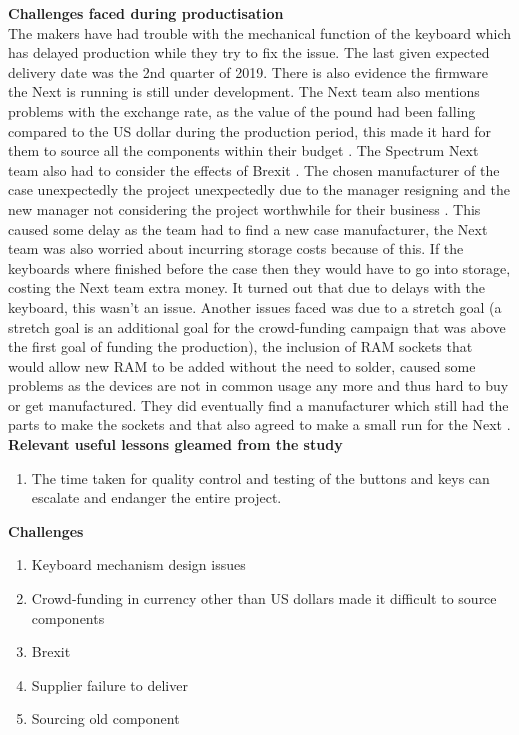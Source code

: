 \textbf{Challenges faced during productisation}\\
The makers have had trouble with the mechanical function of the keyboard which has delayed production while they try to fix the issue. The last given expected delivery date was the 2nd quarter of 2019. There is also evidence the firmware the Next is running is still under development. The Next team also mentions problems with the exchange rate, as the value of the pound had been falling compared to the US dollar during the production period, this made it hard for them to source all the components within their budget 
\cite{RN159}. The Spectrum Next team also had to consider the effects of Brexit 
\cite{RN157}. The chosen manufacturer of the case unexpectedly the project unexpectedly due to the manager resigning and the new manager not considering the project worthwhile for their business 
\cite{RN158}. This caused some delay as the team had to find a new case manufacturer, the Next team was also worried about incurring storage costs because of this. If the keyboards where finished before the case then they would have to go into storage, costing the Next team extra money. It turned out that due to delays with the keyboard, this wasn't an issue. Another issues faced was due to a stretch goal (a stretch goal is an additional goal for the crowd-funding campaign that was above the first goal of funding the production), the inclusion of RAM sockets that would allow new RAM to be added without the need to solder, caused some problems as the devices are not in common usage any more and thus hard to buy or get manufactured. They did eventually find a manufacturer which still had the parts to make the sockets and that also agreed to make a small run for the Next 
\cite{RN159}. \\

\textbf{Relevant useful lessons gleamed from the study}
\begin{enumerate}
\item The time taken for quality control and testing of the buttons and keys can escalate and endanger the entire project.\\
\end{enumerate}

\textbf{Challenges}
\begin{enumerate}
\item Keyboard mechanism design issues
\item Crowd-funding in currency other than US dollars made it difficult to source components
\item Brexit
\item Supplier failure to deliver
\item Sourcing old component 
\end{enumerate}

